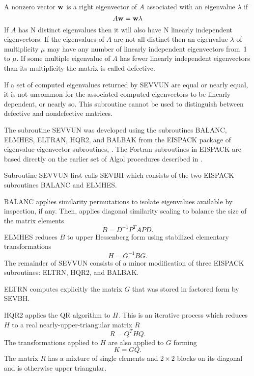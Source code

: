 \documentclass[twoside]{MATH77}
\begin{document}
A nonzero vector ${\bf w}$ is a right eigenvector of $A$ associated with an
eigenvalue $\lambda $ if%
\begin{equation*}
A{\bf w}={\bf w}\lambda
\end{equation*}
If $A$ has N distinct eigenvalues then it will also have N linearly
independent eigenvectors. If the eigenvalues of $A$ are not all distinct then
an eigenvalue $\lambda $ of multiplicity $\mu $ may have any number of
linearly independent eigenvectors from~1 to $\mu $. If some multiple
eigenvalue of $A$ has fewer linearly independent eigenvectors than its
multiplicity the matrix is called defective.

If a set of computed eigenvalues returned by SEVVUN are equal or nearly equal,
it is not uncommon for the associated computed eigenvectors to be
linearly dependent, or nearly so.  This subroutine cannot be used
to distinguish between defective and nondefective matrices.

The subroutine SEVVUN was developed using the
subroutines BALANC, ELMHES, ELTRAN, HQR2, and BALBAK from the EISPACK
package of eigenvalue-eigenvector subroutines, \cite{Smith:1974:MER}. The Fortran
subroutines in EISPACK are based directly on the earlier set of Algol
procedures described in \cite{Wilkinson:1971:HAC}.

Subroutine SEVVUN first calls SEVBH which consists of the two EISPACK
subroutines BALANC and ELMHES.

BALANC applies similarity permutations to isolate eigenvalues available by
inspection, if any. Then, applies diagonal similarity scaling to balance the
size of the matrix elements%
\begin{equation*}
B=D^{-1}P^TAPD.
\end{equation*}
ELMHES reduces $B$ to upper Hessenberg form using stabilized elementary
transformations%
\begin{equation*}
H=G^{-1}BG.
\end{equation*}
The remainder of SEVVUN consists of a minor modification of three
EISPACK subroutines: ELTRN, HQR2, and BALBAK.

ELTRN computes explicitly the matrix $G$ that was stored in factored form by
SEVBH.

HQR2 applies the QR algorithm to $H$. This is an iterative process which
reduces $H$ to a real nearly-upper-triangular matrix $R$%
\begin{equation*}
R=Q^THQ.
\end{equation*}
The transformations applied to $H$ are also applied to $G$ forming%
\begin{equation*}
K=GQ.
\end{equation*}
The matrix $R$ has a mixture of single elements and $2\times 2$
blocks on its diagonal and is otherwise upper triangular.
\end{document}
